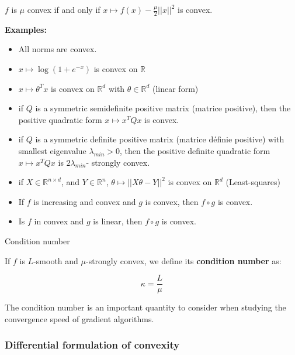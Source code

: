 \documentclass[
10pt, %
a4paper, %
oneside, %
headinclude,footinclude, %
BCOR5mm, %
]{scrartcl}
\begin{document}
\begin{proposition}
    $f$ is $ \mu$ convex if and only if $ x\mapsto f(x)- \frac{\mu}{2} ||x||^2$ is convex.
\end{proposition}

\textbf{{Examples:}} 

\begin{itemize}
    \item All norms are convex.
    \item $x\mapsto \log(1+e^{-x})$ is convex on $ \mathbb{R} $
    \item $x\mapsto \theta^Tx$ is convex on $ \mathbb{R}^d$ with $\theta \in \mathbb{R}^d$ (linear form)
    \item if $Q$ is a symmetric semidefinite positive matrix (matrice positive), then the positive quadratic form $x\mapsto x^TQx$ is convex.
    \item if $Q$ is a symmetric definite positive matrix (matrice définie positive) with smallest eigenvalue $\lambda_{min}>0$, then the positive definite quadratic form $x\mapsto x^TQx$ is $ 2\lambda_{min}$- strongly convex.
    \item if $X\in \mathbb{R}^{n\times d}$, and $Y\in \mathbb{R}^n$, $\theta\mapsto ||X\theta-Y||^2$ is convex on $ \mathbb{R}^d$ (Least-squares)
    \item If $f$ is increasing and convex and $g$ is convex, then $f \circ g $ is convex.
    \item Is $f$ in convex and $g$ is linear, then $f \circ g $ is convex.
\end{itemize}

\begin{definition}{Condition number}

    If $f$ is $L$-smooth and $\mu$-strongly convex, we define its \textbf{{condition number}} as:

    \begin{equation*}
        \kappa = \frac{L}{\mu} 
    \end{equation*}

\end{definition}

\begin{remark}
    The condition number is an important quantity to consider when studying the convergence speed of gradient algorithms.
\end{remark}


\subsubsection{\large\color{Periwinkle}Differential formulation of convexity}
\end{document}
